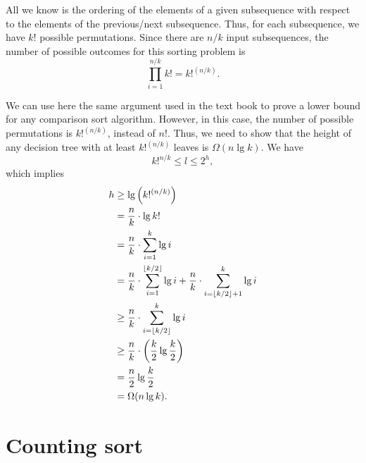 \begin{enumerate}
\begin{framed}
All we know is the ordering of the elements of a given subsequence with respect
to the elements of the previous/next subsequence. Thus, for each subsequence,
we have $k!$ possible permutations. Since there are $n/k$ input subsequences,
the number of possible outcomes for this sorting problem is
\[
  \prod_{i = 1}^{n/k} k! = k!^{(n/k)}.
\]

We can use here the same argument used in the text book to prove a lower bound
for any comparison sort algorithm. However, in this case, the number of possible
permutations is $k!^{(n/k)}$, instead of $n!$.  Thus, we need to show that the
height of any decision tree with at least $k!^{(n/k)}$ leaves is
$\Omega(n \lg k)$.  We have
\[
  k!^{n/k} \le l \le 2^h,
\]
which implies
\begin{equation*}
\begin{aligned}
h &\ge \lg \left( k!^{(n/k)} \right)\\
  &=   \frac{n}{k} \cdot \lg k!\\
  &=   \frac{n}{k} \cdot \sum_{i = 1}^{k} \lg i\\
  &=   \frac{n}{k} \cdot \sum_{i = 1}^{\lfloor k/2\rfloor} \lg i + \frac{n}{k} \cdot \sum_{i = \lfloor k/2\rfloor + 1}^{k} \lg i\\
  &\ge \frac{n}{k} \cdot \sum_{i = \lfloor k/2\rfloor}^{k} \lg i\\
  &\ge \frac{n}{k} \cdot \left( \frac{k}{2} \lg \frac{k}{2} \right)\\
  &=   \frac{n}{2} \lg \frac{k}{2}\\
  &=   \Omega(n \lg k).\\
\end{aligned}
\end{equation*}
\end{framed}

\end{enumerate}

\newpage

\section{Counting sort}

